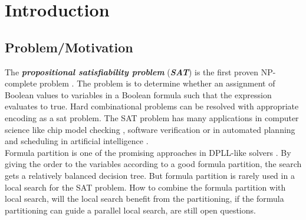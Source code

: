 \documentclass[12pt,a4paper,twoside]{scrartcl}
\numberwithin{equation}{section}
\begin{document}
\vfill\vfill\vfill
\clearpage


\pagestyle{plain}
  
\renewcommand\sectionmark[1]{\markboth{\thesection\quad\MakeUppercase{#1}}{\thesection\quad\MakeUppercase{#1}}}
\renewcommand\subsectionmark[1]{\markright{\thesubsection\quad\MakeUppercase{#1}}}


\tableofcontents
\afterpage{\null\newpage}
\clearpage

\pagestyle{normal}

\section{Introduction} 
\label{sec:Intro}
\subsection{Problem/Motivation} 
The \emph{\textbf{propositional satisfiability problem}} (\emph{\textbf{SAT}}) is the first proven NP-complete problem \cite{cook1971complexity}. The problem is to determine whether an assignment of Boolean values to variables in a  Boolean formula such that the expression evaluates to true. Hard combinational problems can be resolved with appropriate encoding as a sat problem.
The SAT problem has many applications in computer science like chip model checking  \cite{clarke2001bounded}, software verification \cite{ivanvcic2008efficient} or in automated planning and scheduling in artificial intelligence  \cite{kautz1999unifying}. \\
Formula partition is one of the promising approaches in DPLL-like solvers  \cite{mann2017guiding}. By giving the order to the variables according to a good formula partition, the search gets a relatively balanced decision tree. But formula partition is rarely used in a local search for the SAT problem. How to combine the formula partition with local search, will the local search benefit from the partitioning, if the formula partitioning can guide a parallel local search, are still open questions. 
\end{document}
